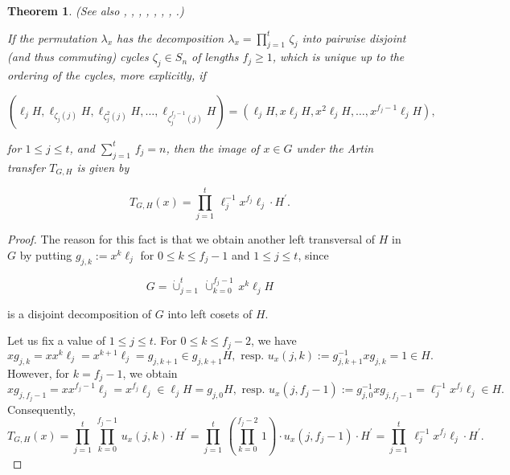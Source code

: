 \documentclass{amsart}
\newtheorem{theorem}{Theorem}[section]
\theoremstyle{definition}
\numberwithin{equation}{section}
\begin{document}
\begin{theorem}
\label{lem:CycDec}
(See also
\cite[\S 2, p.50]{Ar2},
\cite[\S 27.4, p.170]{Ha},
\cite[Hilfssatz 1.7, p.415]{Hp},
\cite[Thm.3.3, p.249]{Gs},
\cite[(37.3), p.198]{Ab},
\cite[p.154]{SmTb},
\cite[Lem.5.5, p.153]{Is},
\cite[p.5]{Ol}.)

If the permutation \(\lambda_x\) has the decomposition \(\lambda_x=\prod_{j=1}^t\,\zeta_j\) into pairwise disjoint (and thus commuting) cycles \(\zeta_j\in S_n\) of lengths \(f_j\ge 1\),
which is unique up to the ordering of the cycles, more explicitly, if

\begin{equation}
\label{eqn:CycleAction}
(\ell_jH,\ell_{\zeta_j(j)}H,\ell_{\zeta_j^2(j)}H,\ldots,\ell_{\zeta_j^{f_j-1}(j)}H)=(\ell_jH,x\ell_jH,x^2\ell_jH,\ldots,x^{f_j-1}\ell_jH),
\end{equation}

\noindent
for \(1\le j\le t\), and \(\sum_{j=1}^t\,f_j=n\),
then the image of \(x\in G\) under the Artin transfer \(T_{G,H}\) is given by

\begin{equation}
\label{eqn:TransferCycleForm}
T_{G,H}(x)=\prod_{j=1}^t\,\ell_j^{-1}x^{f_j}\ell_j\cdot H^\prime.
\end{equation}

\end{theorem}


\begin{proof}
The reason for this fact is that we obtain another left transversal of \(H\) in \(G\) by putting
\(g_{j,k}:=x^k\ell_j\) for \(0\le k\le f_j-1\) and \(1\le j\le t\), since

\begin{equation}
\label{eqn:LeftTransvOfCycles}
G=\dot{\cup}_{j=1}^t\,\dot{\cup}_{k=0}^{f_j-1}\,x^k\ell_jH
\end{equation}

\noindent
is a disjoint decomposition of \(G\) into left cosets of \(H\).

Let us fix a value of \(1\le j\le t\).
For \(0\le k\le f_j-2\), we have
\[xg_{j,k}=xx^k\ell_j=x^{k+1}\ell_j=g_{j,k+1}\in g_{j,k+1}H,
\text{ resp. } u_x(j,k):=g_{j,k+1}^{-1}xg_{j,k}=1\in H.\]
However, for \(k=f_j-1\), we obtain
\[xg_{j,f_j-1}=xx^{f_j-1}\ell_j=x^{f_j}\ell_j\in\ell_jH=g_{j,0}H,
\text{ resp. } u_x(j,f_j-1):=g_{j,0}^{-1}xg_{j,f_j-1}=\ell_j^{-1}x^{f_j}\ell_j\in H.\]
Consequently,
\[T_{G,H}(x)=\prod_{j=1}^t\,\prod_{k=0}^{f_j-1}\,u_x(j,k)\cdot H^\prime
=\prod_{j=1}^t\,(\prod_{k=0}^{f_j-2}\,1)\cdot u_x(j,f_j-1)\cdot H^\prime
=\prod_{j=1}^t\,\ell_j^{-1}x^{f_j}\ell_j\cdot H^\prime.\]
\end{proof}
\end{document}
